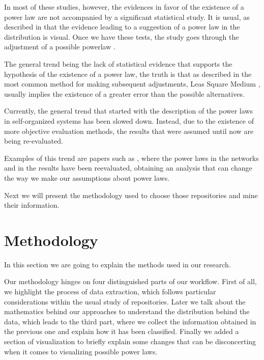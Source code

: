 \documentclass[conference]{IEEEtran}
\begin{document}
In most of these studies, however, the evidences in favor of the existence of a power law are not accompanied by a significant statistical study. It is usual, as described in \cite{newman2005power} that the evidence leading to a suggestion of a power law in the distribution is visual. Once we have these tests, the study goes through the adjustment of a possible powerlaw \cite{merelo2017self,arafat2009commit}.

The general trend being the lack of statistical evidence that supports the hypothesis of the existence of a power law, the truth is that as described in \cite{newman2005power, clauset2009power} the most common method for making subsequent adjustments, Leas Square Medium \cite{merelo2017self,arafat2009commit,merelo16:self}, usually implies the existence of a greater error than the possible alternatives.

Currently, the general trend that started with the description of the power laws in self-organized systems has been slowed down. Instead, due to the existence of more objective evaluation methods, the results that were assumed until now are being re-evaluated.

Examples of this trend are papers such as \cite{Holme2019, Broido2019}, where the power laws in the networks and in the results have been reevaluated, obtaining an analysis that can change the way we make our assumptions about power laws.

Next we will present the methodology used to choose those repositories and
mine their information. 




\section{Methodology}
\label{sec:method}

In this section we are going to explain the methods used in our
research.

Our methodology hinges on four distinguished parts of our workflow.
First of all, we highlight the process of data extraction, which
follows particular considerations within the usual study of
repositories. Later we talk about the mathematics behind our
approaches to understand the distribution behind the data, which leads
to the third part, where we collect the information obtained in the
previous one and explain how it has been classified. Finally we added
a section of visualization to briefly explain some changes that can be
disconcerting when it comes to visualizing possible power laws.
\end{document}
